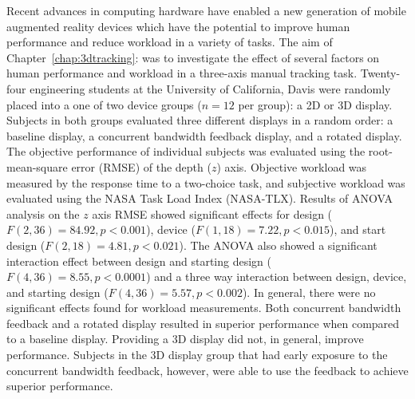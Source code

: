 Recent advances in computing hardware have enabled a new generation of mobile augmented reality devices which have the potential to improve human performance and reduce workload in a variety of tasks.
The aim of Chapter~\ref{chap:3dtracking}:  was to investigate the effect of several factors on human performance and workload in a three-axis manual tracking task.
Twenty-four engineering students at the University of California, Davis were randomly placed into a one of two device groups ($n=12$ per group): a 2D or 3D display.
Subjects in both groups evaluated three different displays in a random order: a baseline display, a concurrent bandwidth feedback display, and a rotated display.
The objective performance of individual subjects was evaluated using the root-mean-square error (RMSE) of the depth ($z$) axis.
Objective workload was measured by the response time to a two-choice task, and subjective workload was evaluated using the NASA Task Load Index (NASA-TLX).
Results of ANOVA analysis on the $z$ axis RMSE showed significant effects for design ($F(2, 36)=84.92, p<0.001$), device ($F(1, 18)=7.22, p<0.015$), and start design ($F(2, 18)=4.81, p<0.021$).
The ANOVA also showed a significant interaction effect between design and starting design ($F(4, 36)=8.55, p<0.0001$) and a three way interaction between design, device, and starting design ($F(4, 36)=5.57, p<0.002$).
In general, there were no significant effects found for workload measurements.
Both concurrent bandwidth feedback and a rotated display resulted in superior performance when compared to a baseline display.
Providing a 3D display did not, in general, improve performance.
Subjects in the 3D display group that had early exposure to the concurrent bandwidth feedback, however, were able to use the feedback to achieve superior performance.


